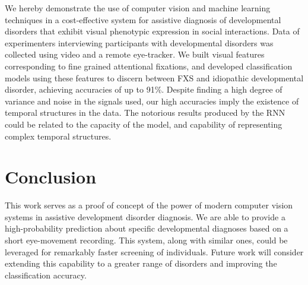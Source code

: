 \documentclass{llncs}
\begin{document}
  We hereby demonstrate the use of computer vision and machine learning techniques in a cost-effective system for assistive diagnosis of developmental disorders that exhibit visual phenotypic expression in social interactions. Data of experimenters interviewing participants with developmental disorders was collected using video and a remote eye-tracker. We built visual features corresponding to fine grained attentional fixations, and developed classification models using these features to discern between FXS and idiopathic developmental disorder, achieving accuracies of up to 91\%. Despite finding a high degree of variance and noise in the signals used, our high accuracies imply the existence of temporal structures in the data. The notorious results produced by the RNN could be related to the capacity of the model, and capability of representing complex temporal structures.


  \vspace*{-\baselineskip}
  \section{Conclusion}
  \vspace*{-\baselineskip}

  This work serves as a proof of concept of the power of modern computer vision systems in assistive development disorder diagnosis. We are able to provide a high-probability prediction about specific developmental diagnoses based on a short eye-movement recording. This system, along with similar ones, could be leveraged for remarkably faster screening of individuals. Future work will consider extending this capability to a greater range of disorders and improving the classification accuracy.

  
  
\end{document}
